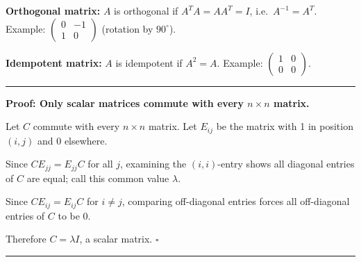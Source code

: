 \documentclass[12pt,a3paper]{article}
\begin{document}
\begin{tcolorbox}[enhanced,breakable,
  colback=cA!4,colframe=cA,boxrule=0.8pt,arc=5pt,
  title={\textbf{Answer --- Orthogonal/Idempotent Matrices; Scalar Matrices; Partitioned $AB$}},
  fonttitle=\bfseries\color{white},colbacktitle=cA]
 
\textbf{Orthogonal matrix:} $A$ is orthogonal if $A^T A = A A^T = I$, i.e.\ $A^{-1}=A^T$.
\quad Example: $\begin{pmatrix}0&-1\\1&0\end{pmatrix}$ (rotation by $90^\circ$).
 
\medskip
\textbf{Idempotent matrix:} $A$ is idempotent if $A^2 = A$.
\quad Example: $\begin{pmatrix}1&0\\0&0\end{pmatrix}$.
 
\medskip
\textcolor{cA}{\rule{\textwidth}{0.4pt}}
 
\textbf{Proof: Only scalar matrices commute with every $n\times n$ matrix.}
 
Let $C$ commute with every $n\times n$ matrix.  Let $E_{ij}$ be the matrix with 1 in position $(i,j)$ and 0 elsewhere.
 
Since $C E_{jj} = E_{jj} C$ for all $j$, examining the $(i,i)$-entry shows all diagonal entries of $C$ are equal; call this common value $\lambda$.
 
Since $C E_{ij} = E_{ij} C$ for $i\neq j$, comparing off-diagonal entries forces all off-diagonal entries of $C$ to be 0.
 
Therefore $C = \lambda I$, a scalar matrix. \hfill$\square$
 
\medskip
\textcolor{cA}{\rule{\textwidth}{0.4pt}}
 

\end{tcolorbox}
\end{document}
